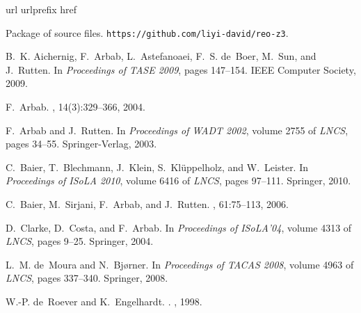 \documentclass[preprint,3p]{elsarticle}
\begin{document}
%
%
\begin{thebibliography}{ 10}
\expandafter\ifx\csname url\endcsname\relax
  \def\url#1{\texttt{#1}}\fi
\expandafter\ifx\csname urlprefix\endcsname\relax\def\urlprefix{URL }\fi
\expandafter\ifx\csname href\endcsname\relax
  \def\href#1#2{#2} \def\path#1{#1}\fi

Package of source files.
\newblock \url{https://github.com/liyi-david/reo-z3}.

B.~K. Aichernig, F.~Arbab, L.~Astefanoaei, F.~S. de~Boer, M.~Sun, and
  J.~Rutten.
\newblock In {\em {Proceedings of TASE 2009}}, pages 147--154. IEEE Computer
  Society, 2009.

F.~Arbab.
, 14(3):329--366,
  2004.

F.~Arbab and J.~Rutten.
\newblock In {\em Proceedings of WADT 2002}, volume 2755 of {\em LNCS}, pages 34--55.
  Springer-Verlag, 2003.

C.~Baier, T.~Blechmann, J.~Klein, S.~Kl{\"u}ppelholz, and W.~Leister.
\newblock In {\em Proceedings of ISoLA 2010}, volume 6416 of {\em LNCS}, pages
  97--111. Springer, 2010.

C.~Baier, M.~Sirjani, F.~Arbab, and J.~Rutten.
, 61:75--113, 2006.

D.~Clarke, D.~Costa, and F.~Arbab.
\newblock In {\em Proceedings of ISoLA'04}, volume 4313 of {\em LNCS}, pages
  9--25. Springer, 2004.

L.~M. de~Moura and N.~Bj{\o}rner.
\newblock In {\em Proceedings of TACAS 2008}, volume 4963 of {\em LNCS}, pages
  337--340. Springer, 2008.

W.-P. de~Roever and K.~Engelhardt.
.
, 1998.


\end{thebibliography}
\end{document}
